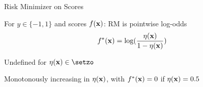 \documentclass[11pt,compress,t,notes=noshow, xcolor=table]{beamer}
\begin{document}
\begin{framei}[sep=S]{Risk Minimizer on Scores}

\item For $y \in \{-1, 1\}$ and scores $f(\mathbf{x})$: RM is pointwise log-odds
$$f^{\ast}(\mathbf{x}) =  \log (\frac{\eta(\mathbf{x})}{1-\eta(\mathbf{x}) })$$
\item Undefined for $\eta(\xv) \in \setzo$
\item Monotonously increasing in $\eta(\mathbf{x})$, with  $f^{\ast}(\mathbf{x}) = 0$ if $\eta(\mathbf{x})=0.5$

\vfill






\end{framei}
\end{document}
